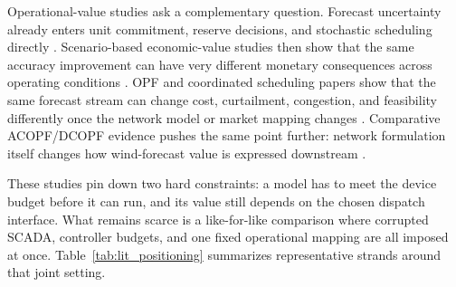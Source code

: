 ﻿\documentclass[review,1p,times]{elsarticle}
\begin{document}
Operational-value studies ask a complementary question. Forecast uncertainty already enters unit commitment, reserve decisions, and stochastic scheduling directly \citep{wang2011wind,quan2015computational,yan2025economicvalue}. Scenario-based economic-value studies then show that the same accuracy improvement can have very different monetary consequences across operating conditions \citep{yan2025economicvalue}. OPF and coordinated scheduling papers show that the same forecast stream can change cost, curtailment, congestion, and feasibility differently once the network model or market mapping changes \citep{khaloie2020coordinated,li2024opf_highren,liu2024vscopf,larrahondo2021acdcomp}. Comparative ACOPF/DCOPF evidence pushes the same point further: network formulation itself changes how wind-forecast value is expressed downstream \citep{larrahondo2021acdcomp}.

These studies pin down two hard constraints: a model has to meet the device budget before it can run, and its value still depends on the chosen dispatch interface. What remains scarce is a like-for-like comparison where corrupted SCADA, controller budgets, and one fixed operational mapping are all imposed at once. Table~\ref{tab:lit_positioning} summarizes representative strands around that joint setting.
\end{document}
